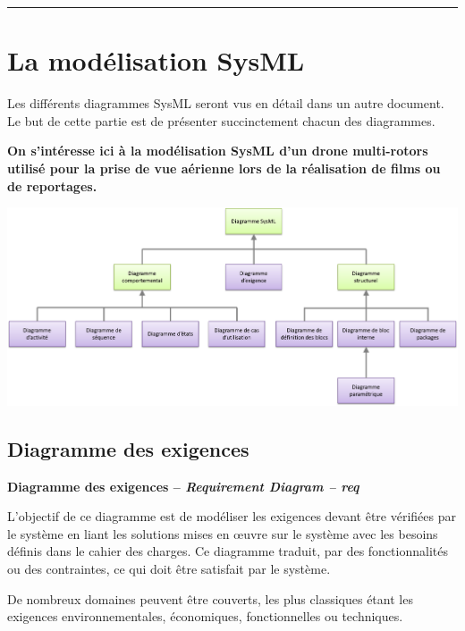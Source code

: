 \documentclass[11pt,oneside]{article}
\begin{document}
\noindent\rule[0.5ex]{\textwidth}{0.1mm}

\section{La modélisation SysML \cite{sii}}
Les différents diagrammes SysML seront vus en détail dans un autre document. Le but de cette partie est de présenter succinctement chacun des diagrammes.

\textbf{On s'intéresse ici à la modélisation SysML d'un drone multi-rotors utilisé pour la prise de vue aérienne lors de la réalisation de films ou de reportages.}
\begin{center}
\includegraphics[width=\textwidth]{png/diagrammes_sysml}
\end{center}

\subsection{Diagramme des exigences}
\begin{defi}
\textbf{Diagramme des exigences -- \textit{Requirement Diagram -- req}}

L’objectif de ce diagramme est de modéliser les exigences devant être vérifiées par le
système en liant les solutions mises en \oe{}uvre sur le système avec les besoins définis dans le
cahier des charges. Ce diagramme traduit, par des fonctionnalités ou des contraintes, ce qui
doit être satisfait par le système.

De nombreux domaines peuvent être couverts, les plus classiques étant les exigences
environnementales, économiques, fonctionnelles ou techniques.
\end{defi}
\end{document}

